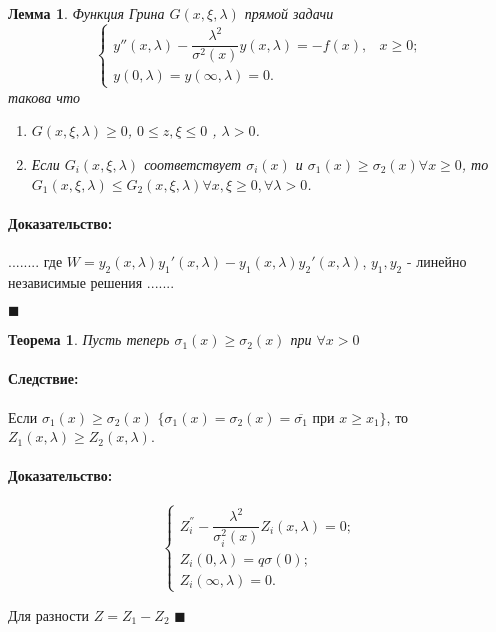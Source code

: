 \documentclass{article}
\newtheorem{theorem}{Теорема}
\newtheorem{lemma}{Лемма}
\newenvironment{proof}{\paragraph{Доказательство:}}{\hfill$\blacksquare$}
\newenvironment{hence}{ \paragraph{Следствие:}}{}
\begin{document}
\begin{lemma}
	Функция Грина $G(x,\xi,\lambda)$ прямой задачи
	\begin{equation*}
	\begin{cases}
		y''(x,\lambda) - \dfrac{\lambda^2}{\sigma^2(x)} y(x,\lambda) = -f(x), & x \geqslant 0;\\
		y(0,\lambda) = y(\infty,\lambda) = 0.
	\end{cases}
	\end{equation*}
	такова что 
	\begin{enumerate}
		\item $G(x,\xi,\lambda) \geqslant 0$, $ 0 \leqslant z,\xi \leqslant 0$ , $\lambda > 0$.
		\item Если $G_i(x,\xi,\lambda)$ соответствует $\sigma_i(x)$ и $\sigma_1(x) \geqslant \sigma_2(x) \forall x \geqslant 0$, то 
		$G_1(x,\xi,\lambda) \leqslant G_2(x,\xi,\lambda) \forall x,\xi \geqslant 0, \forall \lambda > 0$.
	\end{enumerate}
\end{lemma}
\begin{proof}
	........
	где $W = y_2(x,\lambda) y_1'(x,\lambda) - y_1(x,\lambda)y_2'(x,\lambda)$, $y_1, y_2$ - линейно независимые решения
	.......
	
\end{proof}

\begin{theorem}
	Пусть теперь $\sigma_1(x) \geqslant \sigma_2(x)$ при $\forall x > 0$
\end{theorem}

\begin{hence}
	Если $\sigma_1(x) \geqslant \sigma_2(x)$ $\{\sigma_1(x) = \sigma_2(x) = \overline{\sigma_1}$ при $ x \geqslant x_1 \}$, то $Z_1(x,\lambda) \geqslant Z_2(x,\lambda)$.
\end{hence}
\begin{proof}
	\begin{equation*}
	\begin{cases}
		Z_i^{''} - \dfrac{\lambda^2}{\sigma_i^2(x)} Z_i(x,\lambda) = 0;\\
		Z_i(0,\lambda) = q\sigma(0);\\
		Z_i(\infty,\lambda) = 0.
	\end{cases}
	\end{equation*}
	
	Для разности $Z = Z_1 - Z_2$
\end{proof}
\end{document}
